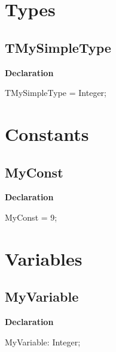 \documentclass{report}
\begin{document}
\section{Types}
\subsection*{TMySimpleType}
\begin{list}{}{
\setlength{\itemindent}{0cm}
\setlength{\listparindent}{0cm}
\setlength{\leftmargin}{\evensidemargin}
\addtolength{\leftmargin}{\tmplength}
\settowidth{\labelsep}{X}
\addtolength{\leftmargin}{\labelsep}
\setlength{\labelwidth}{\tmplength}
}
\begin{flushleft}
\item[\textbf{Declaration}\hfill]
\begin{ttfamily}
TMySimpleType = Integer;\end{ttfamily}


\end{flushleft}
\end{list}
\section{Constants}
\subsection*{MyConst}
\begin{list}{}{
\setlength{\itemindent}{0cm}
\setlength{\listparindent}{0cm}
\setlength{\leftmargin}{\evensidemargin}
\addtolength{\leftmargin}{\tmplength}
\settowidth{\labelsep}{X}
\addtolength{\leftmargin}{\labelsep}
\setlength{\labelwidth}{\tmplength}
}
\begin{flushleft}
\item[\textbf{Declaration}\hfill]
\begin{ttfamily}
MyConst = 9;\end{ttfamily}


\end{flushleft}
\end{list}
\section{Variables}
\subsection*{MyVariable}
\begin{list}{}{
\setlength{\itemindent}{0cm}
\setlength{\listparindent}{0cm}
\setlength{\leftmargin}{\evensidemargin}
\addtolength{\leftmargin}{\tmplength}
\settowidth{\labelsep}{X}
\addtolength{\leftmargin}{\labelsep}
\setlength{\labelwidth}{\tmplength}
}
\begin{flushleft}
\item[\textbf{Declaration}\hfill]
\begin{ttfamily}
MyVariable: Integer;\end{ttfamily}


\end{flushleft}
\end{list}
\end{document}
